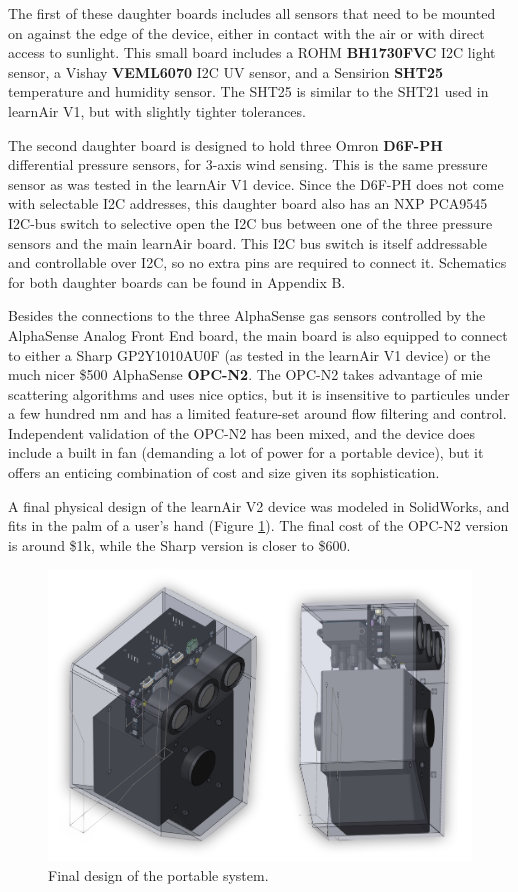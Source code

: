The first of these daughter boards includes all sensors that need to be mounted on against the edge of the device, either in contact with the air or with direct access to sunlight.  This small board includes a ROHM \textbf{BH1730FVC} I2C light sensor, a Vishay \textbf{VEML6070} I2C UV sensor, and a Sensirion \textbf{SHT25} temperature and humidity sensor.  The SHT25 is similar to the SHT21 used in learnAir V1, but with slightly tighter tolerances. 

The second daughter board is designed to hold three Omron \textbf{D6F-PH} differential pressure sensors, for 3-axis wind sensing.  This is the same pressure sensor as was tested in the learnAir V1 device.  Since the D6F-PH does not come with selectable I2C addresses, this daughter board also has an NXP PCA9545	 I2C-bus switch to selective open the I2C bus between one of the three pressure sensors and the main learnAir board.  This I2C bus switch is itself addressable and controllable over I2C, so no extra pins are required to connect it.  Schematics for both daughter boards can be found in Appendix B.

Besides the connections to the three AlphaSense gas sensors controlled by the AlphaSense Analog Front End board, the main board is also equipped to connect to either a Sharp GP2Y1010AU0F (as tested in the learnAir V1 device) or the much nicer \$500 AlphaSense \textbf{OPC-N2}.  The OPC-N2 takes advantage of mie scattering algorithms and uses nice optics, but it is insensitive to particules under a few hundred nm and has a limited feature-set around flow filtering and control.  Independent validation of the OPC-N2 has been mixed, and the device does include a built in fan (demanding a lot of power for a portable device), but it offers an enticing combination of cost and size given its sophistication.

A final physical design of the learnAir V2 device was modeled in SolidWorks, and fits in the palm of a user's hand (Figure \ref{fig:learnairbox}).  The final cost of the OPC-N2 version is around \$1k, while the Sharp version is closer to \$600.  

\begin{figure}[htb]
 	\includegraphics[width=\textwidth]{visuals/learnairV2box}               
 	 \caption{Final design of the portable system.}
  	\label{fig:learnairbox}
\end{figure}

